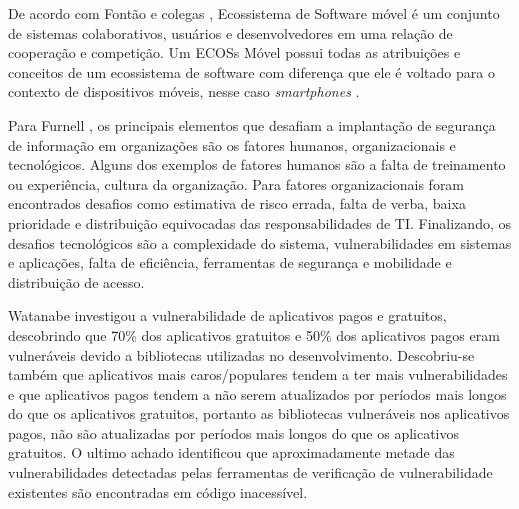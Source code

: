 De acordo com Fontão e colegas \cite{fontao}, Ecossistema de Software móvel é um conjunto de sistemas colaborativos, usuários e desenvolvedores em uma relação de cooperação e competição. Um ECOSs Móvel possui todas as atribuições e conceitos de um ecossistema de software com diferença que ele é voltado para o contexto de dispositivos móveis, nesse caso \textit{smartphones} \cite{mestradoCaio}.

Para Furnell \cite{furnell2009integrated}, os principais elementos que desafiam a implantação de segurança de informação em organizações são os fatores humanos, organizacionais e tecnológicos. Alguns dos exemplos de fatores humanos são a falta de treinamento ou experiência, cultura da organização. Para fatores organizacionais foram encontrados desafios como estimativa de risco errada, falta de verba, baixa prioridade e distribuição equivocadas das responsabilidades de TI. Finalizando, os desafios tecnológicos são a complexidade do sistema, vulnerabilidades em sistemas e aplicações, falta de eficiência, ferramentas de segurança e mobilidade e distribuição de acesso.

Watanabe \cite{watanabe2017understanding} investigou a vulnerabilidade de aplicativos pagos e gratuitos, descobrindo que 70{\%} dos aplicativos gratuitos e 50{\%} dos aplicativos pagos eram vulneráveis devido a bibliotecas utilizadas no desenvolvimento. Descobriu-se também que aplicativos mais caros/populares tendem a ter mais vulnerabilidades e que aplicativos pagos tendem a não serem atualizados por períodos mais longos do que os aplicativos gratuitos, portanto as bibliotecas vulneráveis nos aplicativos pagos, não são atualizadas por períodos mais longos do que os aplicativos gratuitos.  O ultimo achado identificou que aproximadamente metade das vulnerabilidades detectadas pelas ferramentas de verificação de vulnerabilidade existentes são encontradas em código inacessível.

